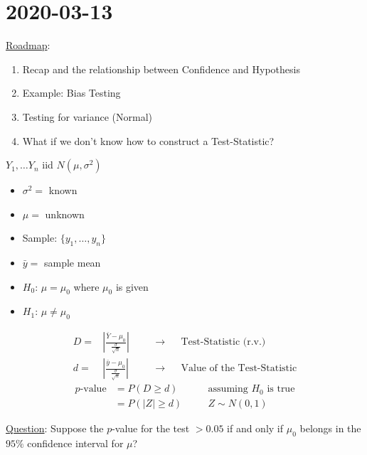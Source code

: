 \section{2020-03-13}
\underline{Roadmap}:
\begin{enumerate}[label=(\roman*)]
    \item Recap and the relationship between Confidence and Hypothesis
    \item Example: Bias Testing
    \item Testing for variance (Normal)
    \item What if we don't know how to construct a Test-Statistic?
\end{enumerate}

\begin{exbox}
    \begin{example}
        $ Y_1,\ldots Y_n $ iid $ N(\mu,\sigma^2) $
        \begin{itemize}
            \item $ \sigma^2= $ known
            \item $ \mu= $ unknown
            \item Sample: $ \{y_1,\ldots ,y_n\} $
            \item $ \bar{y}= $ sample mean
            \item $ H_0 $: $ \mu=\mu_0 $ where $ \mu_0 $ is given
            \item $ H_1 $: $ \mu \neq \mu_0 $
        \end{itemize}
        \[
            \begin{aligned}
                D= & \left|\frac{\bar{Y}-\mu_0}{\frac{\sigma}{\sqrt{n}}} \right|
                   & \quad                                                       & \rightarrow &  & \text{Test-Statistic (r.v.)}       \\
                d= & \left|\frac{\bar{y}-\mu_0}{\frac{\sigma}{\sqrt{n}}} \right|
                   &                                                             & \rightarrow &  & \text{Value of the Test-Statistic}
            \end{aligned}
        \]
        \[
            \begin{aligned}
                p\text{-value}
                 & =P(D\geqslant d)   & \quad & \text{assuming }H_0\text{ is true} \\
                 & =P(|Z|\geqslant d) &       & Z \sim N(0,1)
            \end{aligned}
        \]
    \end{example}
\end{exbox}
\underline{Question}: Suppose the $ p $-value for the test $ >0.05 $
if and only if $ \mu_0 $ belongs in the $ 95\% $ confidence interval for $ \mu $?

